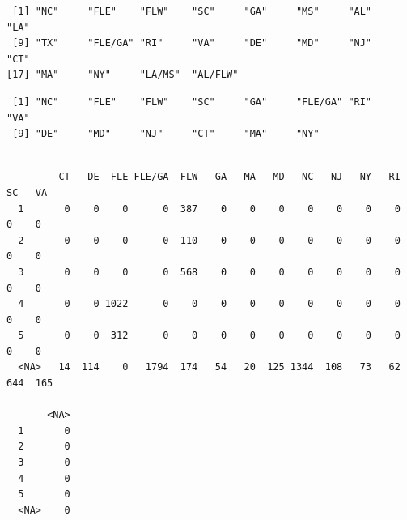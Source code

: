 \documentclass[
  letterpaper,
  oneside,
  open=any]{scrbook}
\newenvironment{Shaded}{\begin{snugshade}}{\end{snugshade}}
\newcommand{\AttributeTok}[1]{\textcolor[rgb]{0.40,0.45,0.13}{#1}}
\newcommand{\CommentTok}[1]{\textcolor[rgb]{0.37,0.37,0.37}{#1}}
\newcommand{\FunctionTok}[1]{\textcolor[rgb]{0.28,0.35,0.67}{#1}}
\newcommand{\NormalTok}[1]{\textcolor[rgb]{0.00,0.23,0.31}{#1}}
\newcommand{\OtherTok}[1]{\textcolor[rgb]{0.00,0.23,0.31}{#1}}
\newcommand{\SpecialCharTok}[1]{\textcolor[rgb]{0.37,0.37,0.37}{#1}}
\newcommand{\StringTok}[1]{\textcolor[rgb]{0.13,0.47,0.30}{#1}}
\begin{document}
\begin{Shaded}
\end{Shaded}

\begin{verbatim}
 [1] "NC"     "FLE"    "FLW"    "SC"     "GA"     "MS"     "AL"     "LA"    
 [9] "TX"     "FLE/GA" "RI"     "VA"     "DE"     "MD"     "NJ"     "CT"    
[17] "MA"     "NY"     "LA/MS"  "AL/FLW"
\end{verbatim}

\begin{Shaded}
\end{Shaded}

\begin{verbatim}
 [1] "NC"     "FLE"    "FLW"    "SC"     "GA"     "FLE/GA" "RI"     "VA"    
 [9] "DE"     "MD"     "NJ"     "CT"     "MA"     "NY"    
\end{verbatim}

\begin{Shaded}
\end{Shaded}

\begin{verbatim}
      
         CT   DE  FLE FLE/GA  FLW   GA   MA   MD   NC   NJ   NY   RI   SC   VA
  1       0    0    0      0  387    0    0    0    0    0    0    0    0    0
  2       0    0    0      0  110    0    0    0    0    0    0    0    0    0
  3       0    0    0      0  568    0    0    0    0    0    0    0    0    0
  4       0    0 1022      0    0    0    0    0    0    0    0    0    0    0
  5       0    0  312      0    0    0    0    0    0    0    0    0    0    0
  <NA>   14  114    0   1794  174   54   20  125 1344  108   73   62  644  165
      
       <NA>
  1       0
  2       0
  3       0
  4       0
  5       0
  <NA>    0
\end{verbatim}
\end{document}
